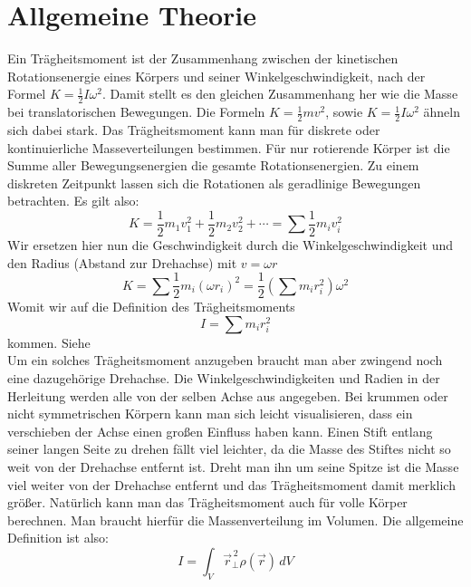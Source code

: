 \documentclass{article}
\begin{document}
	\section{Allgemeine Theorie}\label{Allgemeine_Theorie}
		Ein Trägheitsmoment ist der Zusammenhang zwischen der kinetischen Rotationsenergie eines Körpers und seiner Winkelgeschwindigkeit, nach der Formel \(K = \frac{1}{2}I \omega^2\).
		Damit stellt es den gleichen Zusammenhang her wie die Masse bei translatorischen Bewegungen. Die Formeln \(K = \frac{1}{2} m v^2\), sowie \(K = \frac{1}{2} I \omega^2 \) ähneln sich dabei stark.
		Das Trägheitsmoment kann man für diskrete oder kontinuierliche Masseverteilungen bestimmen.
		Für nur rotierende Körper ist die Summe aller Bewegungsenergien die gesamte Rotationsenergien. Zu einem diskreten Zeitpunkt lassen sich die Rotationen als geradlinige Bewegungen betrachten. Es gilt also:
		\begin{equation}
			K = \frac{1}{2} m_1 v_1^2 + \frac{1}{2} m_2 v_2^2 + \cdots = \sum \frac{1}{2} m_i v_i^2
		\end{equation}
		Wir ersetzen hier nun die Geschwindigkeit durch die Winkelgeschwindigkeit und den Radius (Abstand zur Drehachse) mit \(v = \omega r\)
		\begin{equation}
			K = \sum \frac{1}{2} m_i {\left( \omega r_i \right)}^2 = \frac{1}{2} \left( \sum m_i r_i^2 \right) \omega^2
		\end{equation} 
		Womit wir auf die Definition des Trägheitsmoments
		\begin{equation}\label{eq:trägheitsmoment_diskret}
			I = \sum m_i r_i^2
		\end{equation} kommen. Siehe~\cite{HallidayPhysik} \\
		Um ein solches Trägheitsmoment anzugeben braucht man aber zwingend noch eine dazugehörige Drehachse.
		Die Winkelgeschwindigkeiten und Radien in der Herleitung werden alle von der selben Achse aus angegeben.
		Bei krummen oder nicht symmetrischen Körpern kann man sich leicht visualisieren, dass ein verschieben der Achse einen großen Einfluss haben kann.
		Einen Stift entlang seiner langen Seite zu drehen fällt viel leichter, da die Masse des Stiftes nicht so weit von der Drehachse entfernt ist.
		Dreht man ihn um seine Spitze ist die Masse viel weiter von der Drehachse entfernt und das Trägheitsmoment damit merklich größer. %
		Natürlich kann man das Trägheitsmoment auch für volle Körper berechnen. Man braucht hierfür die Massenverteilung im Volumen. Die allgemeine Definition ist also:
		\begin{equation}
			I = \int_V \vec{r}_{\bot}^{\,2} \rho(\vec{r}) \,dV
		\end{equation}
\end{document}
